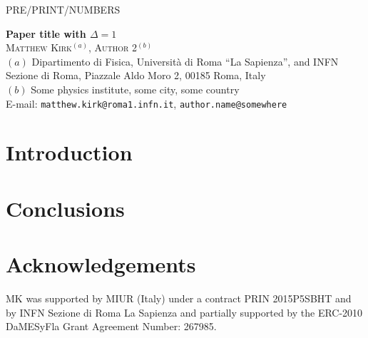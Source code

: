 \documentclass[a4paper,11pt]{article}
\numberwithin{equation}{section} %
\begin{document}
\begin{flushright}
PRE/PRINT/NUMBERS
\end{flushright}

\begin{center}
\vspace*{1cm}
{\LARGE\bfseries%
Paper title with $\Delta = 1$
}
\\[0.8 cm]
\textsc{
Matthew Kirk$^{(a)}$, Author 2$^{(b)}$
}
\\[0.5 cm]
{\small
$(a)$ Dipartimento di Fisica, Università di Roma ``La Sapienza'', and INFN Sezione di Roma, Piazzale Aldo Moro 2, 00185 Roma, Italy \\[0.2cm]
$(b)$ Some physics institute, some city, some country
\\[0.5 cm]
E-mail:
\texttt{matthew.kirk@roma1.infn.it},
\texttt{author.name@somewhere}
}
\end{center}

\vskip1.5cm

\renewcommand{\abstractname}{\Large\bfseries Abstract}

\begin{abstract}
\end{abstract}

\newpage

\section{Introduction}
\label{sec:intro}

\section{Conclusions}
\label{sec:conclusions}

\section*{Acknowledgements}
MK was supported by MIUR (Italy) under a contract PRIN 2015P5SBHT and by INFN Sezione di Roma La Sapienza and partially supported by the ERC-2010 DaMESyFla Grant Agreement Number: 267985.



\end{document}
